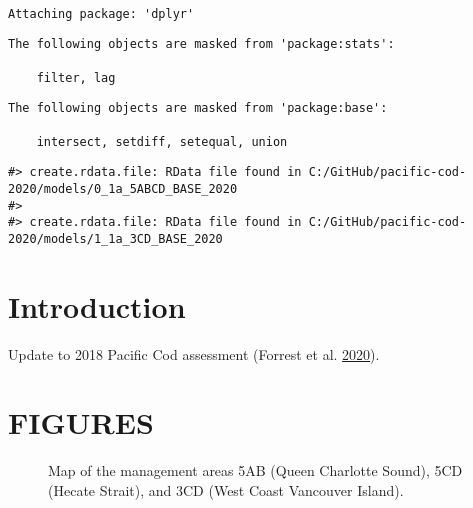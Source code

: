\documentclass[11pt]{book}
\begin{document}
\frontmatter
\begin{verbatim}

Attaching package: 'dplyr'
\end{verbatim}
\begin{verbatim}
The following objects are masked from 'package:stats':

    filter, lag
\end{verbatim}
\begin{verbatim}
The following objects are masked from 'package:base':

    intersect, setdiff, setequal, union
\end{verbatim}
\begin{verbatim}
#> create.rdata.file: RData file found in C:/GitHub/pacific-cod-2020/models/0_1a_5ABCD_BASE_2020
#> 
#> create.rdata.file: RData file found in C:/GitHub/pacific-cod-2020/models/1_1a_3CD_BASE_2020
\end{verbatim}
\clearpage

\hypertarget{introduction}{%
\section{Introduction}\label{introduction}}

Update to 2018 Pacific Cod assessment (Forrest et al. \protect\hyperlink{ref-forrest2020}{2020}).

\clearpage

\hypertarget{figures}{%
\section{FIGURES}\label{figures}}
\begin{figure}[htb]

{\centering {} 

}

\caption{Map of the management areas 5AB (Queen Charlotte Sound), 5CD (Hecate Strait), and 3CD (West Coast Vancouver Island).}\label{fig:fig-map}
\end{figure}
\clearpage
\end{document}
